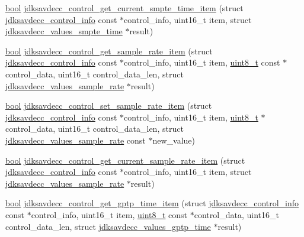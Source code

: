 \begin{DoxyCompactItemize}
\item 
\hyperlink{avb__gptp_8h_af6a258d8f3ee5206d682d799316314b1}{bool} \hyperlink{group__aem__control__value__helpers_gad00747771f0975baf7c245b4808c5dda}{jdksavdecc\+\_\+control\+\_\+get\+\_\+current\+\_\+smpte\+\_\+time\+\_\+item} (struct \hyperlink{structjdksavdecc__control__info}{jdksavdecc\+\_\+control\+\_\+info} const $\ast$control\+\_\+info, uint16\+\_\+t item, struct \hyperlink{structjdksavdecc__values__smpte__time}{jdksavdecc\+\_\+values\+\_\+smpte\+\_\+time} $\ast$result)
\item 
\hyperlink{avb__gptp_8h_af6a258d8f3ee5206d682d799316314b1}{bool} \hyperlink{group__aem__control__value__helpers_ga9014ffb63991de374110aa58b4ce01bd}{jdksavdecc\+\_\+control\+\_\+get\+\_\+sample\+\_\+rate\+\_\+item} (struct \hyperlink{structjdksavdecc__control__info}{jdksavdecc\+\_\+control\+\_\+info} const $\ast$control\+\_\+info, uint16\+\_\+t item, \hyperlink{stdint_8h_aba7bc1797add20fe3efdf37ced1182c5}{uint8\+\_\+t} const $\ast$control\+\_\+data, uint16\+\_\+t control\+\_\+data\+\_\+len, struct \hyperlink{structjdksavdecc__values__sample__rate}{jdksavdecc\+\_\+values\+\_\+sample\+\_\+rate} $\ast$result)
\item 
\hyperlink{avb__gptp_8h_af6a258d8f3ee5206d682d799316314b1}{bool} \hyperlink{group__aem__control__value__helpers_ga0e5abee7a74fc139caaef0663c3003d9}{jdksavdecc\+\_\+control\+\_\+set\+\_\+sample\+\_\+rate\+\_\+item} (struct \hyperlink{structjdksavdecc__control__info}{jdksavdecc\+\_\+control\+\_\+info} const $\ast$control\+\_\+info, uint16\+\_\+t item, \hyperlink{stdint_8h_aba7bc1797add20fe3efdf37ced1182c5}{uint8\+\_\+t} $\ast$control\+\_\+data, uint16\+\_\+t control\+\_\+data\+\_\+len, struct \hyperlink{structjdksavdecc__values__sample__rate}{jdksavdecc\+\_\+values\+\_\+sample\+\_\+rate} const $\ast$new\+\_\+value)
\item 
\hyperlink{avb__gptp_8h_af6a258d8f3ee5206d682d799316314b1}{bool} \hyperlink{group__aem__control__value__helpers_gaf9e8bf0d473d87ca05437405149e7477}{jdksavdecc\+\_\+control\+\_\+get\+\_\+current\+\_\+sample\+\_\+rate\+\_\+item} (struct \hyperlink{structjdksavdecc__control__info}{jdksavdecc\+\_\+control\+\_\+info} const $\ast$control\+\_\+info, uint16\+\_\+t item, struct \hyperlink{structjdksavdecc__values__sample__rate}{jdksavdecc\+\_\+values\+\_\+sample\+\_\+rate} $\ast$result)
\item 
\hyperlink{avb__gptp_8h_af6a258d8f3ee5206d682d799316314b1}{bool} \hyperlink{group__aem__control__value__helpers_gac881f959c3956a7cf97c21bb4fd16ca4}{jdksavdecc\+\_\+control\+\_\+get\+\_\+gptp\+\_\+time\+\_\+item} (struct \hyperlink{structjdksavdecc__control__info}{jdksavdecc\+\_\+control\+\_\+info} const $\ast$control\+\_\+info, uint16\+\_\+t item, \hyperlink{stdint_8h_aba7bc1797add20fe3efdf37ced1182c5}{uint8\+\_\+t} const $\ast$control\+\_\+data, uint16\+\_\+t control\+\_\+data\+\_\+len, struct \hyperlink{structjdksavdecc__values__gptp__time}{jdksavdecc\+\_\+values\+\_\+gptp\+\_\+time} $\ast$result)

\end{DoxyCompactItemize}
